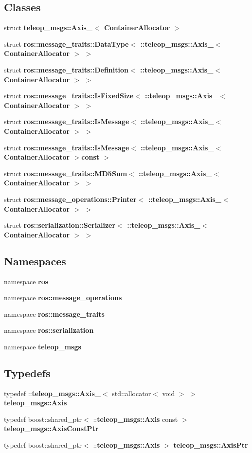 \subsection*{Classes}
\begin{DoxyCompactItemize}
\item 
struct {\bf teleop\_\-msgs::Axis\_\-$<$ ContainerAllocator $>$}
\item 
struct {\bf ros::message\_\-traits::DataType$<$ ::teleop\_\-msgs::Axis\_\-$<$ ContainerAllocator $>$ $>$}
\item 
struct {\bf ros::message\_\-traits::Definition$<$ ::teleop\_\-msgs::Axis\_\-$<$ ContainerAllocator $>$ $>$}
\item 
struct {\bf ros::message\_\-traits::IsFixedSize$<$ ::teleop\_\-msgs::Axis\_\-$<$ ContainerAllocator $>$ $>$}
\item 
struct {\bf ros::message\_\-traits::IsMessage$<$ ::teleop\_\-msgs::Axis\_\-$<$ ContainerAllocator $>$ $>$}
\item 
struct {\bf ros::message\_\-traits::IsMessage$<$ ::teleop\_\-msgs::Axis\_\-$<$ ContainerAllocator $>$const  $>$}
\item 
struct {\bf ros::message\_\-traits::MD5Sum$<$ ::teleop\_\-msgs::Axis\_\-$<$ ContainerAllocator $>$ $>$}
\item 
struct {\bf ros::message\_\-operations::Printer$<$ ::teleop\_\-msgs::Axis\_\-$<$ ContainerAllocator $>$ $>$}
\item 
struct {\bf ros::serialization::Serializer$<$ ::teleop\_\-msgs::Axis\_\-$<$ ContainerAllocator $>$ $>$}
\end{DoxyCompactItemize}
\subsection*{Namespaces}
\begin{DoxyCompactItemize}
\item 
namespace {\bf ros}
\item 
namespace {\bf ros::message\_\-operations}
\item 
namespace {\bf ros::message\_\-traits}
\item 
namespace {\bf ros::serialization}
\item 
namespace {\bf teleop\_\-msgs}
\end{DoxyCompactItemize}
\subsection*{Typedefs}
\begin{DoxyCompactItemize}
\item 
typedef ::{\bf teleop\_\-msgs::Axis\_\-}$<$ std::allocator$<$ void $>$ $>$ {\bf teleop\_\-msgs::Axis}
\item 
typedef boost::shared\_\-ptr$<$ ::{\bf teleop\_\-msgs::Axis} const  $>$ {\bf teleop\_\-msgs::AxisConstPtr}
\item 
typedef boost::shared\_\-ptr$<$ ::{\bf teleop\_\-msgs::Axis} $>$ {\bf teleop\_\-msgs::AxisPtr}
\end{DoxyCompactItemize}
